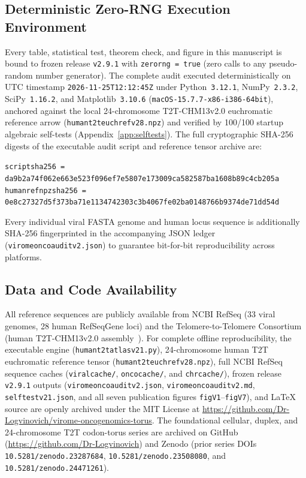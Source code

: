 \documentclass[11pt, a4paper]{article}
\DeclareRobustCommand{\_}{\textunderscore\allowbreak}
\begin{document}
\subsection{Deterministic Zero-RNG Execution Environment}

Every table, statistical test, theorem check, and figure in this manuscript is bound to frozen release \texttt{v2.9.1} with \texttt{zero\_rng = true} (zero calls to any pseudo-random number generator). The complete audit executed deterministically on UTC timestamp \texttt{2026-11-25T12:12:45Z} under Python~\texttt{3.12.1}, NumPy~\texttt{2.3.2}, SciPy~\texttt{1.16.2}, and Matplotlib~\texttt{3.10.6} (\texttt{macOS-15.7.7-x86\_64-i386-64bit}), anchored against the local 24-chromosome T2T-CHM13v2.0 euchromatic reference arrow (\texttt{human\_t2t\_euch\_ref\_v2\_8.npz}) and verified by 100/100 startup algebraic self-tests (Appendix~\ref{app:selftests}). The full cryptographic SHA-256 digests of the executable audit script and reference tensor archive are:
\begin{center}
\footnotesize\texttt{script\_sha256 = da9b2a74f062e663e523f096ef7e5807e173009ca582587ba1608b89c4cb205a} \\
\footnotesize\texttt{human\_ref\_npz\_sha256 = 0e8c27327d5f373ba71e1134742303c3b4067fe02ba0148766b9374de71dd54d}
\end{center}
Every individual viral FASTA genome and human locus sequence is additionally SHA-256 fingerprinted in the accompanying JSON ledger (\texttt{virome\_onco\_audit\_v2.json}) to guarantee bit-for-bit reproducibility across platforms.

\subsection{Data and Code Availability}

All reference sequences are publicly available from NCBI RefSeq (33 viral genomes, 28 human RefSeqGene loci) and the Telomere-to-Telomere Consortium (human T2T-CHM13v2.0 assembly~\cite{nurk2022}). For complete offline reproducibility, the executable engine (\texttt{human\_t2t\_atlas\_v2\_9\_1.py}), 24-chromosome human T2T euchromatic reference tensor (\texttt{human\_t2t\_euch\_ref\_v2\_8.npz}), full NCBI RefSeq sequence caches (\texttt{viral\_cache/}, \texttt{onco\_cache/}, and \texttt{chr\_cache/}), frozen release \texttt{v2.9.1} outputs (\texttt{virome\_onco\_audit\_v2.json}, \texttt{virome\_onco\_audit\_v2.md}, \texttt{selftest\_v2\_9\_1.json}, and all seven publication figures \texttt{fig\_V1}--\texttt{fig\_V7}), and LaTeX source are openly archived under the MIT License at \url{https://github.com/Dr-Logvinovich/virome-oncogenomics-torus}. The foundational cellular, duplex, and 24-chromosome T2T codon-torus series are archived on GitHub (\url{https://github.com/Dr-Logvinovich}) and Zenodo (prior series DOIs \texttt{10.5281/zenodo.23287684}, \texttt{10.5281/zenodo.23508080}, and \texttt{10.5281/zenodo.24471261}).
\end{document}
